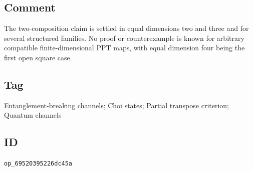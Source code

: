 \subsection*{Comment}

The two-composition claim is settled in equal dimensions two and three and
for several structured families.  No proof or counterexample is known for
arbitrary compatible finite-dimensional PPT maps, with equal dimension four
being the first open square case.

\subsection*{Tag}

Entanglement-breaking channels; Choi states; Partial transpose criterion;
Quantum channels

\subsection*{ID}

\texttt{op\_69520395226dc45a}
